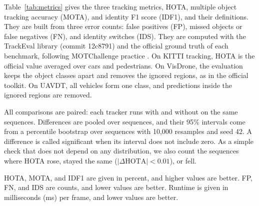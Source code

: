 \label{sec:metrics}Table~\ref{tab:metrics} gives the three tracking metrics,
HOTA, multiple object tracking accuracy (MOTA), and identity F1 score (IDF1),
and their definitions. They are built from three error counts: false
positives (FP), missed objects or false negatives (FN), and identity switches
(IDS). They are computed with the TrackEval library (commit
12c8791) and the official ground truth of each benchmark, following
MOTChallenge practice \cite{dendorfer2021motchallenge}. On KITTI tracking,
HOTA is the official value averaged over cars and pedestrians. On VisDrone,
the evaluation keeps the object classes apart and removes the ignored
regions, as in the official toolkit. On UAVDT, all vehicles form one class, and
predictions inside the ignored regions are removed.



All comparisons are paired: each tracker runs with and without \scl{} on
the same sequences. Differences are pooled over sequences, and their 95\%
intervals come from a percentile bootstrap over sequences
\cite{efron1993bootstrap} with 10,000 resamples and seed 42. A difference is
called significant when its interval does not include zero. As a simple
check that does not depend on any distribution, we also count the sequences
where HOTA rose, stayed the same ($|\Delta\mathrm{HOTA}|<0.01$), or fell.

HOTA, MOTA, and IDF1 are given in percent, and higher values are better. FP,
FN, and IDS are counts, and lower values are better. Runtime is given in
milliseconds (ms) per frame, and lower values are better.
